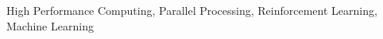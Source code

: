 \begin{IEEEkeywords}
High Performance Computing, Parallel Processing, Reinforcement Learning, Machine Learning
\end{IEEEkeywords}
%
\begin{acronym}[Bash]
\end{acronym}
